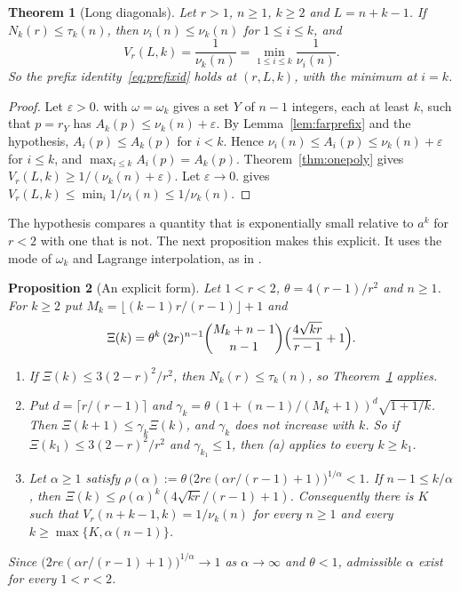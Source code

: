 \documentclass[11pt]{article}
\newtheorem{theorem}{Theorem}[section]
\newtheorem{proposition}[theorem]{Proposition}
\begin{document}
\begin{theorem}[Long diagonals]\label{thm:longdiag}
Let $r>1$, $n\ge1$, $k\ge2$ and $L=n+k-1$.  If $N_k(r)\le\tau_k(n)$, then
$\nu_i(n)\le\nu_k(n)$ for $1\le i\le k$, and
\[
  V_r(L,k)=\frac1{\nu_k(n)}=\min_{1\le i\le k}\frac1{\nu_i(n)} .
\]
So the prefix identity~\eqref{eq:prefixid} holds at
$(r,L,k)$, with the minimum at $i=k$.
\end{theorem}

\begin{proof}
Let $\varepsilon>0$.  \cite[Lemma~3.1]{coefficient-mass-rows} with $\omega=\omega_k$ gives a
set $Y$ of $n-1$ integers, each at least $k$, such that $p=r_Y$ has
$A_k(p)\le\nu_k(n)+\varepsilon$.  By Lemma~\ref{lem:farprefix} and the
hypothesis, $A_i(p)\le A_k(p)$ for $i<k$.  Hence
$\nu_i(n)\le A_i(p)\le\nu_k(n)+\varepsilon$ for $i\le k$, and
$\max_{i\le k}A_i(p)=A_k(p)$.  Theorem~\ref{thm:onepoly} gives
$V_r(L,k)\ge1/(\nu_k(n)+\varepsilon)$.  Let $\varepsilon\to0$.
\cite[Theorem~3.3]{coefficient-mass-rows} gives
$V_r(L,k)\le\min_i1/\nu_i(n)\le1/\nu_k(n)$.
\end{proof}

The hypothesis compares a quantity that is exponentially small relative to
$a^k$ for $r<2$ with one that is not.  The next proposition makes this explicit.  It uses
the mode of $\omega_k$ and Lagrange interpolation, as in
\cite[Lemma~3.4]{coefficient-mass-rows}.

\begin{proposition}[An explicit form]\label{prop:longdiagexplicit}
Let $1<r<2$, $\theta=4(r-1)/r^2$ and $n\ge1$.  For $k\ge2$ put
$M_k=\lfloor(k-1)r/(r-1)\rfloor+1$ and
\[
  \Xi(k)=\theta^k\,(2r)^{n-1}\binom{M_k+n-1}{n-1}
  \Bigl(\frac{4\sqrt{kr}}{r-1}+1\Bigr).
\]
\begin{enumerate}
\item[(a)] If $\Xi(k)\le3(2-r)^2/r^2$, then $N_k(r)\le\tau_k(n)$, so
Theorem~\ref{thm:longdiag} applies.
\item[(b)] Put $d=\lceil r/(r-1)\rceil$ and
$\gamma_k=\theta\,(1+(n-1)/(M_k+1))^d\sqrt{1+1/k}$.  Then $\Xi(k+1)\le\gamma_k\Xi(k)$,
and $\gamma_k$ does not increase with $k$.  So if $\Xi(k_1)\le3(2-r)^2/r^2$ and
$\gamma_{k_1}\le1$, then (a) applies to every $k\ge k_1$.
\item[(c)] Let $\alpha\ge1$ satisfy
$\rho(\alpha):=\theta\,\bigl(2re(\alpha r/(r-1)+1)\bigr)^{1/\alpha}<1$.  If
$n-1\le k/\alpha$, then
$\Xi(k)\le\rho(\alpha)^k(4\sqrt{kr}/(r-1)+1)$.  Consequently there is $K$ such
that $V_r(n+k-1,k)=1/\nu_k(n)$ for every $n\ge1$ and every
$k\ge\max\{K,\alpha(n-1)\}$.
\end{enumerate}
Since $\bigl(2re(\alpha r/(r-1)+1)\bigr)^{1/\alpha}\to1$ as $\alpha\to\infty$
and $\theta<1$, admissible $\alpha$ exist for every $1<r<2$.
\end{proposition}
\end{document}
